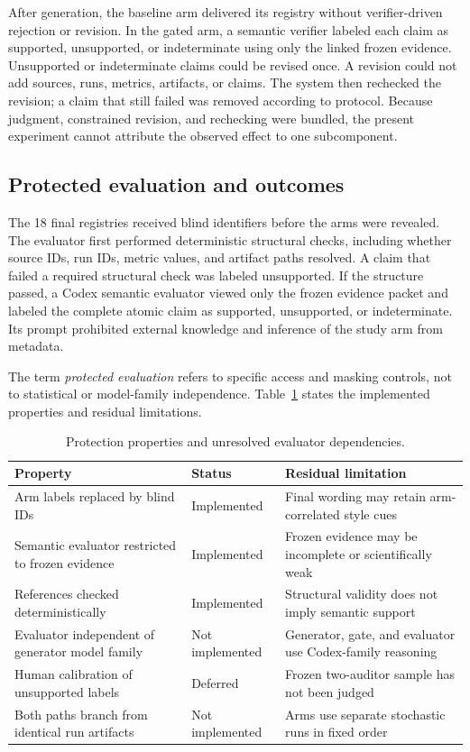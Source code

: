 \documentclass[11pt]{article}
\begin{document}
After generation, the baseline arm delivered its registry without verifier-driven rejection or revision. In the gated arm, a semantic verifier labeled each claim as supported, unsupported, or indeterminate using only the linked frozen evidence. Unsupported or indeterminate claims could be revised once. A revision could not add sources, runs, metrics, artifacts, or claims. The system then rechecked the revision; a claim that still failed was removed according to protocol. Because judgment, constrained revision, and rechecking were bundled, the present experiment cannot attribute the observed effect to one subcomponent.

\subsection{Protected evaluation and outcomes}

The 18 final registries received blind identifiers before the arms were revealed. The evaluator first performed deterministic structural checks, including whether source IDs, run IDs, metric values, and artifact paths resolved. A claim that failed a required structural check was labeled unsupported. If the structure passed, a Codex semantic evaluator viewed only the frozen evidence packet and labeled the complete atomic claim as supported, unsupported, or indeterminate. Its prompt prohibited external knowledge and inference of the study arm from metadata.

The term \emph{protected evaluation} refers to specific access and masking controls, not to statistical or model-family independence. Table~\ref{tab:protection} states the implemented properties and residual limitations.

\begin{table}[H]
\centering
\caption{Protection properties and unresolved evaluator dependencies.}
\label{tab:protection}
\small
\begin{tabularx}{\textwidth}{>{\raggedright\arraybackslash}X l >{\raggedright\arraybackslash}X}
\toprule
Property & Status & Residual limitation \\
\midrule
Arm labels replaced by blind IDs & Implemented & Final wording may retain arm-correlated style cues \\
Semantic evaluator restricted to frozen evidence & Implemented & Frozen evidence may be incomplete or scientifically weak \\
References checked deterministically & Implemented & Structural validity does not imply semantic support \\
Evaluator independent of generator model family & Not implemented & Generator, gate, and evaluator use Codex-family reasoning \\
Human calibration of unsupported labels & Deferred & Frozen two-auditor sample has not been judged \\
Both paths branch from identical run artifacts & Not implemented & Arms use separate stochastic runs in fixed order \\
\bottomrule
\end{tabularx}
\end{table}
\end{document}
